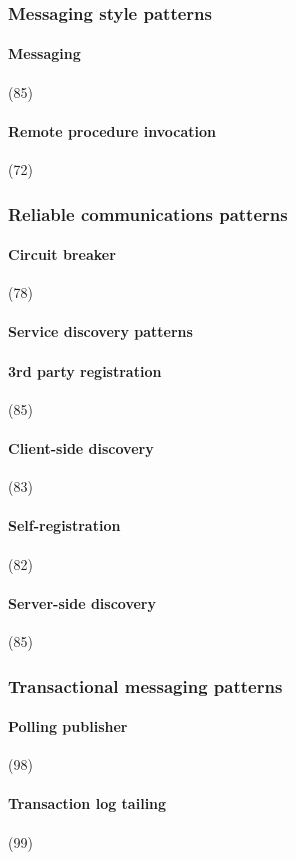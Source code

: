 \subsubsection{Messaging style patterns}

\paragraph{Messaging} (85)
\paragraph{Remote procedure invocation} (72)

\subsubsection{Reliable communications patterns}
\paragraph{Circuit breaker} (78)
\paragraph{Service discovery patterns}
\paragraph{3rd party registration} (85)
\paragraph{Client-side discovery} (83)
\paragraph{Self-registration} (82)
\paragraph{Server-side discovery} (85)

\subsubsection{Transactional messaging patterns}
\paragraph{Polling publisher} (98)
\paragraph{Transaction log tailing} (99)
